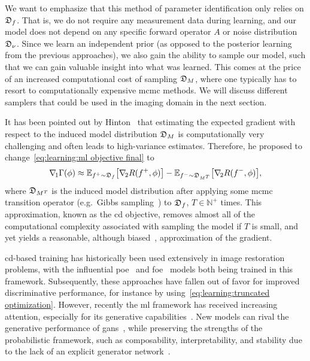 \documentclass[../ml-ct.tex]{subfiles}
\begin{document}
We want to emphasize that this method of parameter identification only relies on \( \mathfrak{D}_{f} \).
That is, we do not require any measurement data during learning, and our model does not depend on any specific forward operator \( A \) or noise distribution \( \mathfrak{D}_{\nu} \).
Since we learn an independent prior (as opposed to the posterior learning from the previous approaches), we also gain the ability to sample our model, such that we can gain valuable insight into what was learned.
This comes at the price of an increased computational cost of sampling \( \mathfrak{D}_{M} \), where one typically has to resort to computationally expensive \gls{mcmc} methods.
We will discuss different samplers that could be used in the imaging domain in the next section.

It has been pointed out by Hinton~\cite{hinton_training_2002} that estimating the expected gradient with respect to the induced model distribution \( \mathfrak{D}_{M} \) is computationally very challenging and often leads to high-variance estimates.
Therefore, he proposed to change~\cref{eq:learning:ml objective final} to
\begin{equation}
	\grad{1} \NLL(\params) \approx \mathbb{E}_{f^+ \sim \distr{f}} \bigl[ \grad{2}R(f^+, \params) \bigr] - \mathbb{E}_{f^- \sim \distr{M^T}} \bigl[ \grad{2} R(f^-, \params) \bigr],%
	\label{eq:learning:contrastive divergence}
\end{equation}
where \( \mathfrak{D}_{M^T} \) is the induced model distribution after applying some \gls{mcmc} transition operator (e.g.\ Gibbs sampling~\cite{geman_stochastic_1984}) to \( \mathfrak{D}_{f} \), \( T \in \mathbb{N}^+ \) times.
This approximation, known as the \gls{cd} objective, removes almost all of the computational complexity associated with sampling the model if \( T \) is small, and yet yields a reasonable, although biased~\cite{perpinan_contrastive_2005}, approximation of the gradient.

\gls{cd}-based training has historically been used extensively in image restoration problems, with the influential \gls{poe}~\cite{hinton_training_2002} and \gls{foe}~\cite{roth_fields_2005} models both being trained in this framework.
Subsequently, these approaches have fallen out of favor for improved discriminative performance, for instance by using~\cref{eq:learning:truncated optimization}.
However, recently the \gls{ml} framework has received increasing attention, especially for its generative capabilities~\cite{du_implicit_2019,nijkamp_shortrun_2019}.
New models can rival the generative performance of \glspl{gan}~\cite{goodfellow_generative_2014}, while preserving the strengths of the probabilistic framework, such as composability, interpretability, and stability due to the lack of an explicit generator network~\cite{du_improved_2020,nijkamp_anatomy_2019}.
\end{document}
